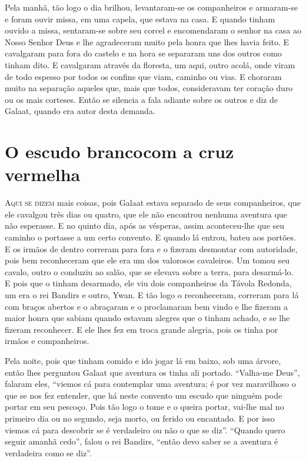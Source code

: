 Pela manhã, tão logo o dia brilhou, levantaram-se os companheiros e armaram-se e
foram ouvir missa, em uma capela, que estava na casa. E quando tinham ouvido a
missa, sentaram-se sobre seu corcel e encomendaram o senhor na casa ao Nosso
Senhor Deus e lhe agradeceram muito pela honra que lhes havia feito. E
cavalgaram para fora do castelo e na hora se separaram uns dos outros como
tinham dito. E cavalgaram através da floresta, um aqui, outro acolá, onde viram
de todo espesso por todos os confins que viam, caminho ou vias. E choraram
muito na separação aqueles que, mais que todos, consideravam ter coração duro
ou os mais corteses. Então se silencia a fala adiante sobre os outros e diz de
Galaat, quando era autor desta demanda. 


\chapter[O escudo branco com a cruz vermelha]{O escudo branco\break com a cruz vermelha}

\textsc{Aqui se dizem} mais coisas, pois Galaat estava separado de seus companheiros, que
ele cavalgou três dias ou quatro, que ele não encontrou nenhuma aventura que
não esperasse. E no quinto dia, após as vésperas, assim aconteceu-lhe que seu
caminho o portasse a um certo convento. E quando lá entrou, bateu aos portões.
E os irmãos de dentro correram para fora e o fizeram desmontar com autoridade,
pois bem reconheceram que ele era um dos valorosos cavaleiros. Um tomou seu
cavalo, outro o conduziu ao salão, que se elevava sobre a terra, para
desarmá-lo. E pois que o tinham desarmado, ele viu dois companheiros da Távola
Redonda, um era o rei Bandirs e outro, Ywan. E tão logo o reconheceram,
correram para lá com braços abertos e o abraçaram e o proclamaram bem vindo e
lhe fizeram a maior honra que sabiam quando estavam alegres que o tinham
achado, e se lhe fizeram reconhecer. E ele lhes fez em troca grande alegria,
pois os tinha por irmãos e companheiros. 

Pela noite, pois que tinham comido e ido jogar lá em baixo, sob uma árvore,
então lhes perguntou Galaat que aventura os tinha ali portado. “Valha-me Deus”,
falaram eles, “viemos cá para contemplar uma aventura; é por vez maravilhoso o
que se nos fez entender, que há neste convento um escudo que ninguém pode
portar em seu pescoço. Pois tão logo o tome e o queira portar, vai-lhe mal no
primeiro dia ou no segundo, seja morto, ou ferido ou encantado. E por isso
viemos cá para descobrir se é verdadeiro ou não o que se diz”. “Quando quero
seguir amanhã cedo”, falou o rei Bandirs, “então devo saber se a aventura é
verdadeira como se diz”. 


